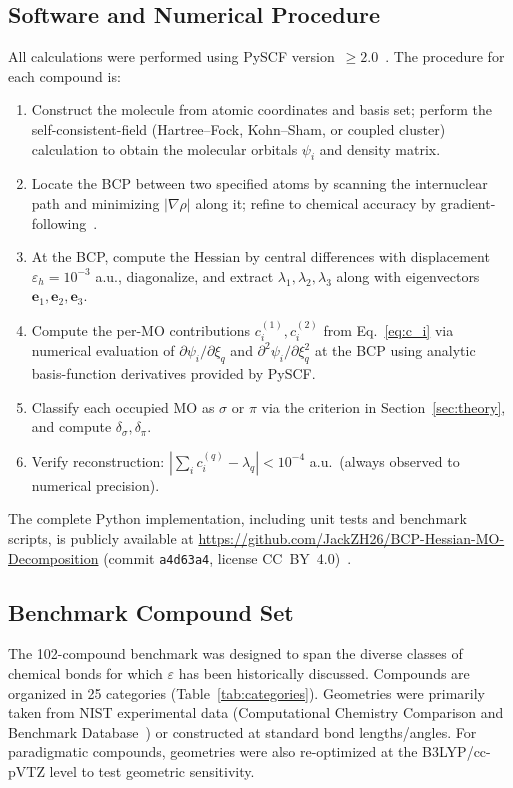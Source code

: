 \documentclass[twoside,natbib]{svjour3}
\newcommand{\delsg}{\delta_{\sigma}}
\newcommand{\delpi}{\delta_{\pi}}
\newcommand{\eps}{\varepsilon}
\begin{document}
\subsection{Software and Numerical Procedure}

All calculations were performed using PySCF version~$\ge 2.0$~\citep{Sun2018,Sun2020}.
The procedure for each compound is:

\begin{enumerate}
\item Construct the molecule from atomic coordinates and basis set; perform the
self-consistent-field (Hartree--Fock, Kohn--Sham, or coupled cluster) calculation
to obtain the molecular orbitals $\psi_i$ and density matrix.
\item Locate the BCP between two specified atoms by scanning the
internuclear path and minimizing $|\nabla \rho|$ along it; refine
to chemical accuracy by gradient-following~\citep{Bader1990}.
\item At the BCP, compute the Hessian by central differences with
displacement $\eps_h = 10^{-3}$ a.u., diagonalize, and extract
$\lambda_1, \lambda_2, \lambda_3$ along with eigenvectors
$\mathbf{e}_1, \mathbf{e}_2, \mathbf{e}_3$.
\item Compute the per-MO contributions
$c_i^{(1)}, c_i^{(2)}$ from Eq.~\ref{eq:c_i} via numerical
evaluation of $\partial \psi_i/\partial \xi_q$ and
$\partial^2 \psi_i/\partial \xi_q^2$ at the BCP using
analytic basis-function derivatives provided by PySCF.
\item Classify each occupied MO as $\sigma$ or $\pi$ via the
criterion in Section~\ref{sec:theory}, and compute $\delsg, \delpi$.
\item Verify reconstruction:
$|\sum_i c_i^{(q)} - \lambda_q| < 10^{-4}$ a.u.\ (always observed
to numerical precision).
\end{enumerate}

The complete Python implementation, including unit tests and
benchmark scripts, is publicly available at
\url{https://github.com/JackZH26/BCP-Hessian-MO-Decomposition}
(commit \texttt{a4d63a4}, license CC~BY~4.0)~\citep{Zhou2026code}.

\subsection{Benchmark Compound Set}

The 102-compound benchmark was designed to span the diverse classes
of chemical bonds for which $\eps$ has been historically discussed.
Compounds are organized in 25 categories
(Table~\ref{tab:categories}). Geometries were primarily taken from
NIST experimental data (Computational Chemistry Comparison and
Benchmark Database~\citep{NISTCCCBDB}) or constructed at standard
bond lengths/angles. For paradigmatic compounds, geometries were
also re-optimized at the B3LYP/cc-pVTZ level to test geometric
sensitivity.
\end{document}
